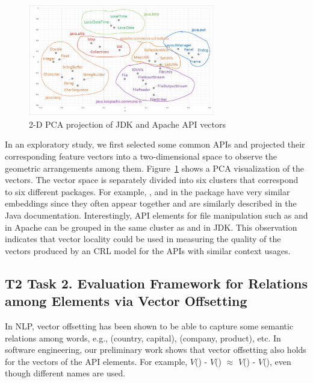 \begin{figure}
	\centering
	\includegraphics[width=3.2in]{graphs/PCA1}
	\caption{2-D PCA projection of JDK and Apache API vectors}
	\label{APIspace}
\end{figure}
In an exploratory study, we first selected some common APIs and
projected their corresponding feature vectors into a two-dimensional
space to observe the geometric arrangements among
them. Figure~\ref{APIspace} shows a PCA visualization of the vectors.
The vector space is separately divided into six clusters that
correspond to six different packages. For example, ,
 and  in the package
 have very similar embeddings since they often appear
together and are similarly described in the Java
documentation. Interestingly, API elements for file manipulation such
as  and  in Apache can be grouped in the
same cluster as  and  in JDK. This
observation indicates that vector locality could be used in measuring
the quality of the vectors produced by an CRL model for the APIs with
similar context usages.


%

\subsection{T2 Task 2. Evaluation Framework for Relations among Elements via Vector Offsetting}

In NLP, vector offsetting has been shown to be able to capture some
semantic relations among words, e.g., (country, capital), (company,
product), etc. In software engineering, our preliminary work shows
that vector offsetting also holds for the vectors of the API elements.
For example, $V$() - $V$() $\approx$
$V$() - $V$(), even though
different names are used.

